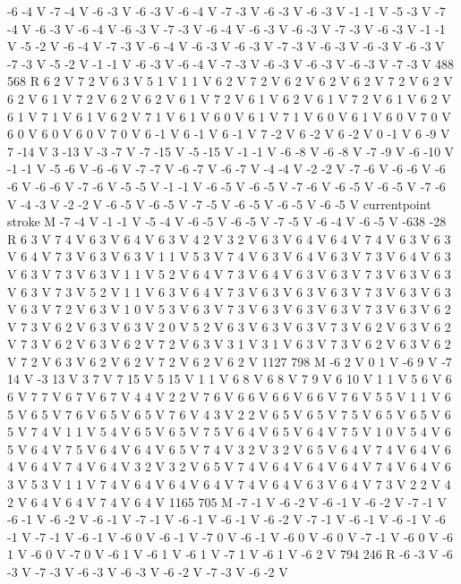 {-6 -4 V
-7 -4 V
-6 -3 V
-6 -3 V
-6 -4 V
-7 -3 V
-6 -3 V
-6 -3 V
-1 -1 V
-5 -3 V
-7 -4 V
-6 -3 V
-6 -4 V
-6 -3 V
-7 -3 V
-6 -4 V
-6 -3 V
-6 -3 V
-7 -3 V
-6 -3 V
-1 -1 V
-5 -2 V
-6 -4 V
-7 -3 V
-6 -4 V
-6 -3 V
-6 -3 V
-7 -3 V
-6 -3 V
-6 -3 V
-6 -3 V
-7 -3 V
-5 -2 V
-1 -1 V
-6 -3 V
-6 -4 V
-7 -3 V
-6 -3 V
-6 -3 V
-6 -3 V
-7 -3 V
488 568 R
6 2 V
7 2 V
6 3 V
5 1 V
1 1 V
6 2 V
7 2 V
6 2 V
6 2 V
6 2 V
7 2 V
6 2 V
6 2 V
6 1 V
7 2 V
6 2 V
6 2 V
6 1 V
7 2 V
6 1 V
6 2 V
6 1 V
7 2 V
6 1 V
6 2 V
6 1 V
7 1 V
6 1 V
6 2 V
7 1 V
6 1 V
6 0 V
6 1 V
7 1 V
6 0 V
6 1 V
6 0 V
7 0 V
6 0 V
6 0 V
6 0 V
7 0 V
6 -1 V
6 -1 V
6 -1 V
7 -2 V
6 -2 V
6 -2 V
0 -1 V
6 -9 V
7 -14 V
3 -13 V
-3 -7 V
-7 -15 V
-5 -15 V
-1 -1 V
-6 -8 V
-6 -8 V
-7 -9 V
-6 -10 V
-1 -1 V
-5 -6 V
-6 -6 V
-7 -7 V
-6 -7 V
-6 -7 V
-4 -4 V
-2 -2 V
-7 -6 V
-6 -6 V
-6 -6 V
-6 -6 V
-7 -6 V
-5 -5 V
-1 -1 V
-6 -5 V
-6 -5 V
-7 -6 V
-6 -5 V
-6 -5 V
-7 -6 V
-4 -3 V
-2 -2 V
-6 -5 V
-6 -5 V
-7 -5 V
-6 -5 V
-6 -5 V
-6 -5 V
currentpoint stroke M
-7 -4 V
-1 -1 V
-5 -4 V
-6 -5 V
-6 -5 V
-7 -5 V
-6 -4 V
-6 -5 V
-638 -28 R
6 3 V
7 4 V
6 3 V
6 4 V
6 3 V
4 2 V
3 2 V
6 3 V
6 4 V
6 4 V
7 4 V
6 3 V
6 3 V
6 4 V
7 3 V
6 3 V
6 3 V
1 1 V
5 3 V
7 4 V
6 3 V
6 4 V
6 3 V
7 3 V
6 4 V
6 3 V
6 3 V
7 3 V
6 3 V
1 1 V
5 2 V
6 4 V
7 3 V
6 4 V
6 3 V
6 3 V
7 3 V
6 3 V
6 3 V
6 3 V
7 3 V
5 2 V
1 1 V
6 3 V
6 4 V
7 3 V
6 3 V
6 3 V
6 3 V
7 3 V
6 3 V
6 3 V
6 3 V
7 2 V
6 3 V
1 0 V
5 3 V
6 3 V
7 3 V
6 3 V
6 3 V
6 3 V
7 3 V
6 3 V
6 2 V
7 3 V
6 2 V
6 3 V
6 3 V
2 0 V
5 2 V
6 3 V
6 3 V
6 3 V
7 3 V
6 2 V
6 3 V
6 2 V
7 3 V
6 2 V
6 3 V
6 2 V
7 2 V
6 3 V
3 1 V
3 1 V
6 3 V
7 3 V
6 2 V
6 3 V
6 2 V
7 2 V
6 3 V
6 2 V
6 2 V
7 2 V
6 2 V
6 2 V
1127 798 M
-6 2 V
0 1 V
-6 9 V
-7 14 V
-3 13 V
3 7 V
7 15 V
5 15 V
1 1 V
6 8 V
6 8 V
7 9 V
6 10 V
1 1 V
5 6 V
6 6 V
7 7 V
6 7 V
6 7 V
4 4 V
2 2 V
7 6 V
6 6 V
6 6 V
6 6 V
7 6 V
5 5 V
1 1 V
6 5 V
6 5 V
7 6 V
6 5 V
6 5 V
7 6 V
4 3 V
2 2 V
6 5 V
6 5 V
7 5 V
6 5 V
6 5 V
6 5 V
7 4 V
1 1 V
5 4 V
6 5 V
6 5 V
7 5 V
6 4 V
6 5 V
6 4 V
7 5 V
1 0 V
5 4 V
6 5 V
6 4 V
7 5 V
6 4 V
6 4 V
6 5 V
7 4 V
3 2 V
3 2 V
6 5 V
6 4 V
7 4 V
6 4 V
6 4 V
6 4 V
7 4 V
6 4 V
3 2 V
3 2 V
6 5 V
7 4 V
6 4 V
6 4 V
6 4 V
7 4 V
6 4 V
6 3 V
5 3 V
1 1 V
7 4 V
6 4 V
6 4 V
6 4 V
7 4 V
6 4 V
6 3 V
6 4 V
7 3 V
2 2 V
4 2 V
6 4 V
6 4 V
7 4 V
6 4 V
1165 705 M
-7 -1 V
-6 -2 V
-6 -1 V
-6 -2 V
-7 -1 V
-6 -1 V
-6 -2 V
-6 -1 V
-7 -1 V
-6 -1 V
-6 -1 V
-6 -2 V
-7 -1 V
-6 -1 V
-6 -1 V
-6 -1 V
-7 -1 V
-6 -1 V
-6 0 V
-6 -1 V
-7 0 V
-6 -1 V
-6 0 V
-6 0 V
-7 -1 V
-6 0 V
-6 1 V
-6 0 V
-7 0 V
-6 1 V
-6 1 V
-6 1 V
-7 1 V
-6 1 V
-6 2 V
794 246 R
-6 -3 V
-6 -3 V
-7 -3 V
-6 -3 V
-6 -3 V
-6 -2 V
-7 -3 V
-6 -2 V
}
